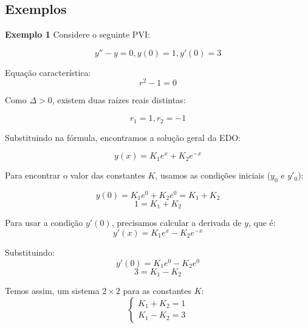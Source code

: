 \documentclass[a4paper]{article}
\begin{document}
\subsection{Exemplos}

\begin{multicols}{2}
{\bf Exemplo 1}
Considere o seguinte PVI:

\begin{displaymath}
  y''-y=0, y(0)=1, y'(0)=3
\end{displaymath}

Equação característica:
\begin{displaymath}
  r^2-1=0
\end{displaymath}

Como $\Delta>0$, existem duas raízes reais distintas:

\begin{displaymath}
  r_1 = 1, r_2=-1
\end{displaymath}

Substituindo na fórmula, encontramos a solução geral da EDO:

\begin{displaymath}
  y(x) = K_1e^x+K_2e^{-x}
\end{displaymath}

Para encontrar o valor das constantes $K$, usamos as condições
iniciais ($y_0$ e $y'_0$):

\begin{displaymath}
  y(0) = K_1e^0+K_2e^0 = K_1 + K_2
\end{displaymath}
\begin{displaymath}
  1=K_1+K_2
\end{displaymath}

Para usar a condição $y'(0)$, precisamos calcular a derivada de $y$,
que é:
\begin{displaymath}
  y'(x) = K_1e^x-K_2e^{-x}
\end{displaymath}

Substituindo:
\begin{displaymath}
    y'(0) = K_1e^0-K_2e^0
\end{displaymath}
\begin{displaymath}
  3=K_1-K_2
\end{displaymath}

Temos assim, um sistema $2 \times 2$ para as constantes $K$:
\begin{displaymath}
  \left\{
    \begin{array}{l}
      K_1+K_2=1\\
      K_1-K_2=3
    \end{array}
\right.
\end{displaymath}


\end{multicols}
\end{document}

